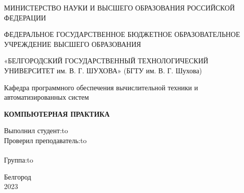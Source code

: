 \begin{titlepage}
	\newpage
	
	\begin{center}
		МИНИСТЕРСТВО НАУКИ И ВЫСШЕГО ОБРАЗОВАНИЯ РОССИЙСКОЙ ФЕДЕРАЦИИ
		
		\vspace{1em}
		
		ФЕДЕРАЛЬНОЕ ГОСУДАРСТВЕННОЕ БЮДЖЕТНОЕ ОБРАЗОВАТЕЛЬНОЕ УЧРЕЖДЕНИЕ ВЫСШЕГО ОБРАЗОВАНИЯ
		
		\vspace{1em}
		
		«БЕЛГОРОДСКИЙ ГОСУДАРСТВЕННЫЙ ТЕХНОЛОГИЧЕСКИЙ УНИВЕРСИТЕТ им. В. Г. ШУХОВА» (БГТУ им. В. Г. Шухова)
		 \\
	\end{center}
	
	\vspace{8em}
	
	\begin{center}
		\Large Кафедра программного обеспечения вычислительной техники и автоматизированных систем \\ 
	\end{center}
	
	\vspace{2em}
	
	\begin{center}
		\textsc{\textbf{КОМПЬЮТЕРНАЯ ПРАКТИКА \linebreak}}
	\end{center}
	
	\vspace{6em}
	
	
	
	\newbox{\lbox}
	\newlength{\maxl}
	\setlength{\maxl}{\wd\lbox}
	\hfill\parbox{11cm}{
		\hspace*{5cm}\hspace*{-5cm}Выполнил студент:\hfill\hbox to\\
		\hspace*{5cm}\hspace*{-5cm}Проверил преподаватель:\hfill\hbox to\\
		\\
		\hspace*{5cm}\hspace*{-5cm}Группа:\hfill\hbox to\\
	}
	
	
	\vspace{\fill}
	
	\begin{center}
		Белгород \\2023
	\end{center}
	
\end{titlepage}